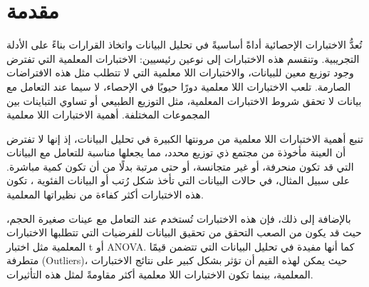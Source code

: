 \chapter*{مقدمة}

تُعدُّ الاختبارات الإحصائية أداةً أساسيةً في تحليل البيانات واتخاذ القرارات بناءً على الأدلة التجريبية. وتنقسم هذه الاختبارات إلى نوعين رئيسيين: الاختبارات المعلمية
  التي تفترض وجود توزيع معين للبيانات، والاختبارات اللا معلمية  التي لا تتطلب مثل هذه الافتراضات الصارمة. تلعب الاختبارات اللا معلمية دورًا حيويًا في الإحصاء، لا سيما عند التعامل مع بيانات لا تحقق شروط الاختبارات المعلمية، مثل التوزيع الطبيعي أو تساوي التباينات بين المجموعات المختلفة.
أهمية الاختبارات اللا معلمية

تنبع أهمية الاختبارات اللا معلمية من مرونتها الكبيرة في تحليل البيانات، إذ إنها لا تفترض أن العينة مأخوذة من مجتمع ذي توزيع محدد، مما يجعلها مناسبة للتعامل مع البيانات التي قد تكون منحرفة، أو غير متجانسة، أو حتى مرتبة بدلًا من أن تكون كمية مباشرة. على سبيل المثال، في حالات البيانات التي تأخذ شكل رُتب 
 أو البيانات الفئوية ، تكون هذه الاختبارات أكثر كفاءة من نظيراتها المعلمية.

بالإضافة إلى ذلك، فإن هذه الاختبارات تُستخدم عند التعامل مع عينات صغيرة الحجم، حيث قد يكون من الصعب التحقق من تحقيق البيانات للفرضيات التي تتطلبها الاختبارات المعلمية مثل اختبار t أو ANOVA. كما أنها مفيدة في تحليل البيانات التي تتضمن قيمًا متطرفة (Outliers)، حيث يمكن لهذه القيم أن تؤثر بشكل كبير على نتائج الاختبارات المعلمية، بينما تكون الاختبارات اللا معلمية أكثر مقاومةً لمثل هذه التأثيرات.